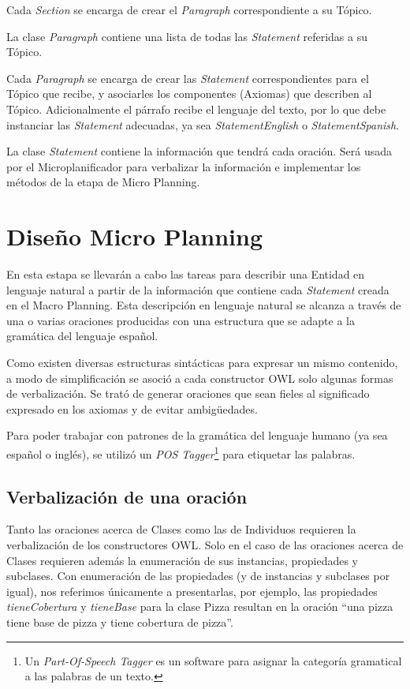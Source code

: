 Cada \emph{Section} se encarga de crear el \emph{Paragraph} correspondiente a su Tópico.

La clase \emph{Paragraph} contiene una lista de todas las \emph{Statement} referidas a su Tópico. 

Cada \emph{Paragraph} se encarga de crear las \emph{Statement} correspondientes para el Tópico que recibe, y asociarles los componentes (Axiomas) que describen al Tópico. Adicionalmente el párrafo recibe el lenguaje del texto, por lo que debe instanciar las \emph{Statement} adecuadas, ya sea \emph{StatementEnglish} o \emph{StatementSpanish}.

La clase \emph{Statement} contiene la información que tendrá cada oración. Será usada por el Microplanificador para verbalizar la información e implementar los métodos de la etapa de Micro Planning. 

\section{Diseño Micro Planning}
En esta estapa se llevarán a cabo las tareas para describir una Entidad en lenguaje natural a partir de la información que contiene cada \emph{Statement} creada en el Macro Planning. Esta descripción en lenguaje natural se alcanza a través de una o varias oraciones producidas con una estructura que se adapte a la gramática del lenguaje español.

Como existen diversas estructuras sintácticas para expresar un mismo contenido, a modo de simplificación se asoció a cada constructor OWL solo algunas formas de verbalización. Se trató de generar oraciones que sean fieles al significado expresado en los axiomas y de evitar ambigüedades.

Para poder trabajar con patrones de la gramática del lenguaje humano (ya sea español o inglés), se utilizó un \emph{POS Tagger}\footnote{Un \emph{Part-Of-Speech Tagger} es un software para asignar la categoría gramatical a las palabras de un texto.} para etiquetar las palabras.

\subsection{Verbalización de una oración}
Tanto las oraciones acerca de Clases como las de Individuos requieren la verbalización de los constructores OWL. Solo en el caso de las oraciones acerca de Clases requieren además la enumeración de sus instancias, propiedades y subclases. Con enumeración de las propiedades (y de instancias y subclases por igual), nos referimos únicamente a presentarlas, por ejemplo, las propiedades \emph{tieneCobertura} y \emph{tieneBase} para la clase Pizza resultan en la oración ``una pizza tiene base de pizza y tiene cobertura de pizza''.

